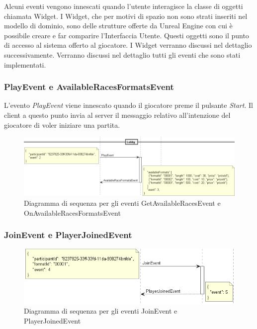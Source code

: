     Alcuni eventi vengono innescati quando l'utente interagisce la classe di oggetti chiamata Widget.
    I Widget, che per motivi di spazio non sono strati inseriti nel modello di dominio, sono delle strutture offerte da Unreal Engine con cui è possibile creare e far comparire l'Interfaccia Utente.
    Questi oggetti sono il punto di accesso al sistema offerto al giocatore.
    I Widget verranno discussi nel dettaglio successivamente.
    Verranno discussi nel dettaglio tutti gli eventi che sono stati implementati.

        \subsubsection{PlayEvent e AvailableRacesFormatsEvent}
        L'evento \textit{PlayEvent} viene innescato quando il giocatore preme il pulsante \textit{Start}.
        Il client a questo punto invia al server il messaggio relativo all'intenzione del giocatore di voler iniziare una partita. 

        \begin{figure}[!ht]
            \centering
            \includegraphics[width=14.5cm]{figure/RacesFormats.png}
            \caption{Diagramma di sequenza per gli eventi GetAvailableRacesEvent e OnAvailableRacesFormatsEvent}
            \label{img:PlayEvent}
        \end{figure}

        \subsubsection{JoinEvent e PlayerJoinedEvent}

        \begin{figure}[!ht]
            \centering
            \includegraphics[width=13cm]{figure/JoinEvent.png}
            \caption{Diagramma di sequenza per gli eventi JoinEvent e PlayerJoinedEvent}
        \end{figure}


